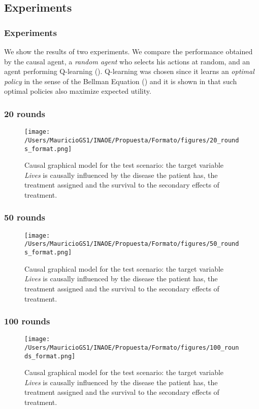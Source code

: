 \documentclass{beamer}
\theoremstyle{plain}
\begin{document}
\subsection{Experiments}
\begin{frame}
\frametitle{Experiments}
We show the results of two experiments. We compare the performance obtained by the causal agent, a \textit{random agent} who selects his actions at random, and an agent performing Q-learning (\cite{watkins1992q}). Q-learning was chosen since it learns an \textit{optimal policy} in the sense of the Bellman Equation (\cite{sutton1998reinforcement}) and it is shown in \cite{webb2007game} that such optimal policies also maximize expected utility. 
\end{frame}

\begin{frame}
\frametitle{20 rounds}
\begin{figure}[ht]
\vskip 0.2in
\begin{center}
\texttt{[image: /Users/MauricioGS1/INAOE/Propuesta/Formato/figures/20\_rounds\_format.png]}
\caption{Causal graphical model for the test scenario: the target variable \textit{Lives} is causally influenced by the disease the patient has, the treatment assigned and the survival to the secondary effects of treatment.}
\label{causal_model}
\end{center}
\vskip -0.2in
\end{figure}
\end{frame}

\begin{frame}
\frametitle{50 rounds}
\begin{figure}[ht]
\vskip 0.2in
\begin{center}
\texttt{[image: /Users/MauricioGS1/INAOE/Propuesta/Formato/figures/50\_rounds\_format.png]}
\caption{Causal graphical model for the test scenario: the target variable \textit{Lives} is causally influenced by the disease the patient has, the treatment assigned and the survival to the secondary effects of treatment.}
\label{causal_model}
\end{center}
\vskip -0.2in
\end{figure}
\end{frame}

\begin{frame}
\frametitle{100 rounds}
\begin{figure}[ht]
\vskip 0.2in
\begin{center}
\texttt{[image: /Users/MauricioGS1/INAOE/Propuesta/Formato/figures/100\_rounds\_format.png]}
\caption{Causal graphical model for the test scenario: the target variable \textit{Lives} is causally influenced by the disease the patient has, the treatment assigned and the survival to the secondary effects of treatment.}
\label{causal_model}
\end{center}
\vskip -0.2in
\end{figure}
\end{frame}
\end{document}

